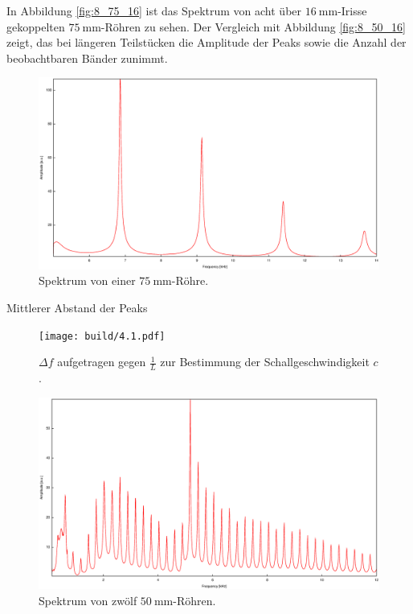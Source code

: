 In Abbildung \ref{fig:8_75_16} ist das Spektrum von acht über $\SI{16}{\milli\meter}$-Irisse gekoppelten $\SI{75}{\milli\meter}$-Röhren zu sehen. Der Vergleich mit Abbildung \ref{fig:8_50_16} zeigt, das bei längeren Teilstücken die Amplitude der Peaks sowie die Anzahl der beobachtbaren Bänder zunimmt.\\
\begin{figure}
\centering
\includegraphics[scale=0.35]{FP-V23data/4.1_75mm.eps}
\caption{Spektrum von einer $\SI{75}{\milli\meter}$-Röhre.}
\label{fig:Spek4_1}
\end{figure}
\begin{table}
\centering
\caption{Mittlerer Abstand der Peaks}

\end{table}
\begin{figure}
\centering
\texttt{[image: build/4.1.pdf]}
\caption{$\Delta f$ aufgetragen gegen $\frac{1}{L}$ zur Bestimmung der Schallgeschwindigkeit $c$.}
\label{fig:Df_L}
\end{figure}
\begin{figure}
\centering
\includegraphics[scale=0.35]{FP-V23data/4.2_600mm.eps}
\caption{Spektrum von zwölf $\SI{50}{\milli\meter}$-Röhren.}
\label{fig:12_50}
\end{figure}
